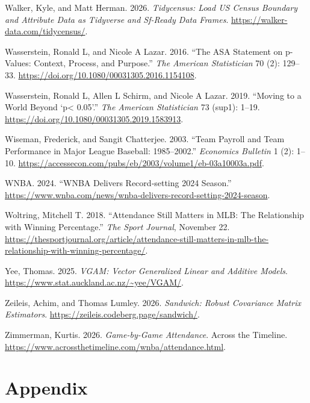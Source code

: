\documentclass[
  letterpaper,
  DIV=11,
  numbers=noendperiod]{scrartcl}
\newlength{\cslhangindent}
\newenvironment{CSLReferences}[2] %
 {\begin{list}{}{%
  \setlength{\itemindent}{0pt}
  \setlength{\leftmargin}{0pt}
  \setlength{\parsep}{0pt}
  \ifodd #1
   \setlength{\leftmargin}{\cslhangindent}
   \setlength{\itemindent}{-1\cslhangindent}
  \fi
  \setlength{\itemsep}{#2\baselineskip}}}
 {\end{list}}
\begin{document}
\begin{CSLReferences}{1}{1}
Walker, Kyle, and Matt Herman. 2026. \emph{Tidycensus: Load US Census
Boundary and Attribute Data as Tidyverse and Sf-Ready Data Frames}.
\url{https://walker-data.com/tidycensus/}.

Wasserstein, Ronald L, and Nicole A Lazar. 2016. {``The ASA Statement on
p-Values: Context, Process, and Purpose.''} \emph{The American
Statistician} 70 (2): 129--33.
\url{https://doi.org/10.1080/00031305.2016.1154108}.

Wasserstein, Ronald L, Allen L Schirm, and Nicole A Lazar. 2019.
{``Moving to a World Beyond {`p\textless{} 0.05'}.''} \emph{The American
Statistician} 73 (sup1): 1--19.
\url{https://doi.org/10.1080/00031305.2019.1583913}.

Wiseman, Frederick, and Sangit Chatterjee. 2003. {``Team Payroll and
Team Performance in Major League Baseball: 1985--2002.''}
\emph{Economics Bulletin} 1 (2): 1--10.
\url{https://accessecon.com/pubs/eb/2003/volume1/eb-03a10003a.pdf}.

WNBA. 2024. {``WNBA Delivers Record‑setting 2024 Season.''}
\url{https://www.wnba.com/news/wnba-delivers-record-setting-2024-season}.

Woltring, Mitchell T. 2018. {``Attendance Still Matters in MLB: The
Relationship with Winning Percentage.''} \emph{The Sport Journal},
November 22.
\url{https://thesportjournal.org/article/attendance-still-matters-in-mlb-the-relationship-with-winning-percentage/}.

Yee, Thomas. 2025. \emph{VGAM: Vector Generalized Linear and Additive
Models}. \url{https://www.stat.auckland.ac.nz/~yee/VGAM/}.

Zeileis, Achim, and Thomas Lumley. 2026. \emph{Sandwich: Robust
Covariance Matrix Estimators}.
\url{https://zeileis.codeberg.page/sandwich/}.

Zimmerman, Kurtis. 2026. \emph{Game-by-Game Attendance}. Across the
Timeline. \url{https://www.acrossthetimeline.com/wnba/attendance.html}.

\end{CSLReferences}

\section{Appendix}\label{appendix}
\end{document}
